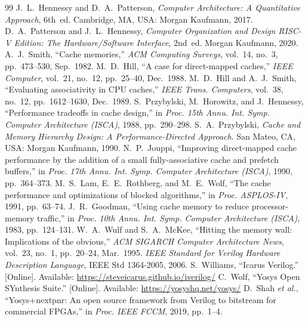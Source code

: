 \documentclass[conference]{IEEEtran}
\begin{document}
\begin{thebibliography}{99}
 J.~L.~Hennessy and D.~A.~Patterson, \emph{Computer Architecture: A Quantitative Approach}, 6th~ed. Cambridge, MA, USA: Morgan Kaufmann, 2017.
 D.~A.~Patterson and J.~L.~Hennessy, \emph{Computer Organization and Design RISC-V Edition: The Hardware/Software Interface}, 2nd~ed. Morgan Kaufmann, 2020.
 A.~J.~Smith, ``Cache memories,'' \emph{ACM Computing Surveys}, vol.~14, no.~3, pp.~473--530, Sep.~1982.
 M.~D.~Hill, ``A case for direct-mapped caches,'' \emph{IEEE Computer}, vol.~21, no.~12, pp.~25--40, Dec.~1988.
 M.~D.~Hill and A.~J.~Smith, ``Evaluating associativity in CPU caches,'' \emph{IEEE Trans. Computers}, vol.~38, no.~12, pp.~1612--1630, Dec.~1989.
 S.~Przybylski, M.~Horowitz, and J.~Hennessy, ``Performance tradeoffs in cache design,'' in \emph{Proc. 15th Annu. Int. Symp. Computer Architecture (ISCA)}, 1988, pp.~290--298.
 S.~A.~Przybylski, \emph{Cache and Memory Hierarchy Design: A Performance-Directed Approach}. San Mateo, CA, USA: Morgan Kaufmann, 1990.
 N.~P.~Jouppi, ``Improving direct-mapped cache performance by the addition of a small fully-associative cache and prefetch buffers,'' in \emph{Proc. 17th Annu. Int. Symp. Computer Architecture (ISCA)}, 1990, pp.~364--373.
 M.~S.~Lam, E.~E.~Rothberg, and M.~E.~Wolf, ``The cache performance and optimizations of blocked algorithms,'' in \emph{Proc. ASPLOS-IV}, 1991, pp.~63--74.
 J.~R.~Goodman, ``Using cache memory to reduce processor-memory traffic,'' in \emph{Proc. 10th Annu. Int. Symp. Computer Architecture (ISCA)}, 1983, pp.~124--131.
 W.~A.~Wulf and S.~A.~McKee, ``Hitting the memory wall: Implications of the obvious,'' \emph{ACM SIGARCH Computer Architecture News}, vol.~23, no.~1, pp.~20--24, Mar.~1995.
 \emph{IEEE Standard for Verilog Hardware Description Language}, IEEE Std 1364-2005, 2006.
 S.~Williams, ``Icarus Verilog.'' [Online]. Available: \url{https://steveicarus.github.io/iverilog/}
 C.~Wolf, ``Yosys Open SYnthesis Suite.'' [Online]. Available: \url{https://yosyshq.net/yosys/}
 D.~Shah \emph{et al.}, ``Yosys+nextpnr: An open source framework from Verilog to bitstream for commercial FPGAs,'' in \emph{Proc. IEEE FCCM}, 2019, pp.~1--4.
\end{thebibliography}
\end{document}
